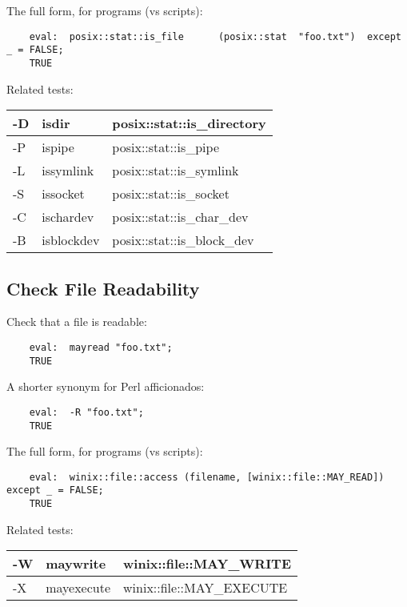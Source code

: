The full form, for programs (vs scripts):
\begin{verbatim}
    eval:  posix::stat::is_file      (posix::stat  "foo.txt")  except _ = FALSE;
    TRUE
\end{verbatim}

Related tests: 
\begin{tabular}{|l|l|l|} \hline
-D & isdir      & posix::stat::is\_directory  \\ \hline
-P & ispipe     & posix::stat::is\_pipe       \\ \hline
-L & issymlink  & posix::stat::is\_symlink    \\ \hline
-S & issocket   & posix::stat::is\_socket     \\ \hline
-C & ischardev  & posix::stat::is\_char\_dev   \\ \hline
-B & isblockdev & posix::stat::is\_block\_dev  \\ \hline
\end{tabular}


\cutend*

\subsection{Check File Readability}

Check that a file is readable:
\begin{verbatim}
    eval:  mayread "foo.txt";
    TRUE
\end{verbatim}

A shorter synonym for Perl afficionados:
\begin{verbatim}
    eval:  -R "foo.txt";
    TRUE
\end{verbatim}

The full form, for programs (vs scripts):
\begin{verbatim}
    eval:  winix::file::access (filename, [winix::file::MAY_READ])     except _ = FALSE;
    TRUE
\end{verbatim}

Related tests: 
\begin{tabular}{|l|l|l|} \hline
-W & maywrite   & winix::file::MAY\_WRITE    \\ \hline
-X & mayexecute & winix::file::MAY\_EXECUTE  \\ \hline
\end{tabular}

\cutend*

